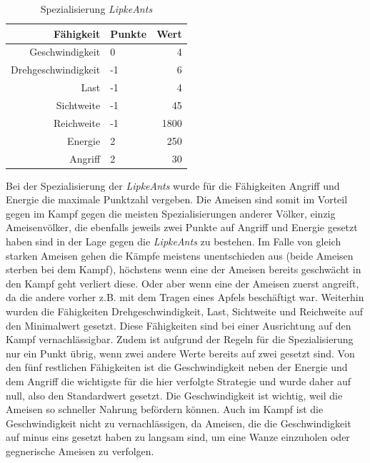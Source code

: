 \begin{table}[hbt]
\centering
\begin{minipage}[t]{.6\textwidth} %
\caption{Spezialisierung \textit{LipkeAnts}} %
\begin{tabularx}{\columnwidth}{rXr}
\toprule
Fähigkeit & Punkte & Wert\\
\midrule
Geschwindigkeit & 0 & 4\\
Drehgeschwindigkeit & -1 & 6\\
Last & -1 & 4\\
Sichtweite & -1 & 45\\
Reichweite & -1 & 1800\\
Energie & 2 & 250\\
Angriff & 2 & 30\\
\bottomrule
\end{tabularx}
\label{tab:lipkeAntsProps}
\end{minipage}
\end{table}

Bei der Spezialisierung der \textit{LipkeAnts} wurde für die Fähigkeiten Angriff und Energie die maximale Punktzahl vergeben. Die Ameisen sind somit im Vorteil gegen im Kampf gegen die meisten Spezialisierungen anderer Völker, einzig Ameisenvölker, die ebenfalls jeweils zwei Punkte auf Angriff und Energie gesetzt haben sind in der Lage gegen die \textit{LipkeAnts} zu bestehen. Im Falle von gleich starken Ameisen gehen die Kämpfe meistens unentschieden aus (beide Ameisen sterben bei dem Kampf), höchstens wenn eine der Ameisen bereits geschwächt in den Kampf geht verliert diese. Oder aber wenn eine der Ameisen zuerst angreift, da die andere vorher z.B. mit dem Tragen eines Apfels beschäftigt war. Weiterhin wurden die Fähigkeiten Drehgeschwindigkeit, Last, Sichtweite und Reichweite auf den Minimalwert gesetzt. Diese Fähigkeiten sind bei einer Ausrichtung auf den Kampf vernachlässigbar. Zudem ist aufgrund der Regeln für die Spezialisierung nur ein Punkt übrig, wenn zwei andere Werte bereits auf zwei gesetzt sind. Von den fünf restlichen Fähigkeiten ist die Geschwindigkeit neben der Energie und dem Angriff die wichtigste für die hier verfolgte Strategie und wurde daher auf null, also den Standardwert gesetzt. Die Geschwindigkeit ist wichtig, weil die Ameisen so schneller Nahrung befördern können. Auch im Kampf ist die Geschwindigkeit nicht zu vernachlässigen, da Ameisen, die die Geschwindigkeit auf minus eins gesetzt haben zu langsam sind, um eine Wanze einzuholen oder gegnerische Ameisen zu verfolgen.

